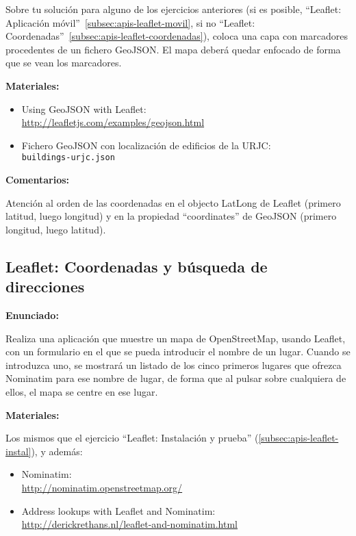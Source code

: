 Sobre tu solución para alguno de los ejercicios anteriores (si es posible, ``Leaflet: Aplicación móvil''~\ref{subsec:apis-leaflet-movil}, si no ``Leaflet: Coordenadas''~\ref{subsec:apis-leaflet-coordenadas}), coloca una capa con marcadores procedentes de un fichero GeoJSON. El mapa deberá quedar enfocado de forma que se vean los marcadores.

\textbf{Materiales:}

\begin{itemize}
\item Using GeoJSON with Leaflet: \\
  \url{http://leafletjs.com/examples/geojson.html}
\item Fichero GeoJSON con localización de edificios de la URJC: \\
  \verb|buildings-urjc.json|
\end{itemize}

\textbf{Comentarios:}

Atención al orden de las coordenadas en el objecto LatLong de Leaflet (primero latitud, luego longitud) y en la propiedad ``coordinates'' de GeoJSON (primero longitud, luego latitud).

\subsection{Leaflet: Coordenadas y búsqueda de direcciones}
\label{subsec:apis-leaflet-nominatim}

\textbf{Enunciado:}

Realiza una aplicación que muestre un mapa de OpenStreetMap, usando Leaflet, con un formulario en el que se pueda introducir el nombre de un lugar. Cuando se introduzca uno, se mostrará un listado de los cinco primeros lugares que ofrezca Nominatim para ese nombre de lugar, de forma que al pulsar sobre cualquiera de ellos, el mapa se centre en ese lugar.

\textbf{Materiales:}

Los mismos que el ejercicio ``Leaflet: Instalación y prueba'' (\ref{subsec:apis-leaflet-instal}), y además:

\begin{itemize}
\item Nominatim: \\
  \url{http://nominatim.openstreetmap.org/}
\item Address lookups with Leaflet and Nominatim: \\
  \url{http://derickrethans.nl/leaflet-and-nominatim.html}
\end{itemize}


